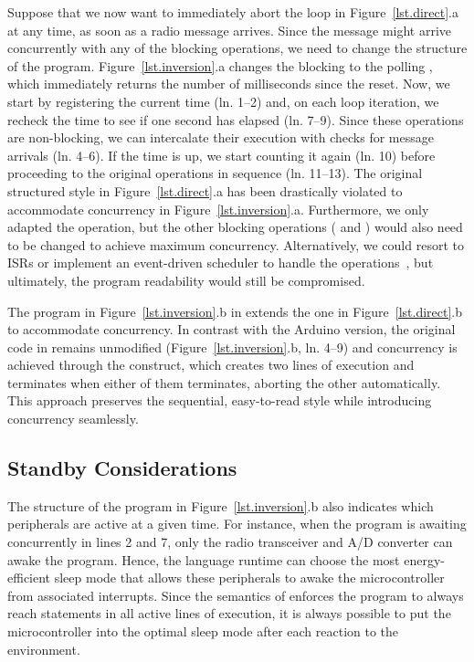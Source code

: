 Suppose that we now want to immediately abort the loop in
Figure~\ref{lst.direct}.a at any time, as soon as a radio message arrives.
%
Since the message might arrive concurrently with any of the blocking
operations, we need to change the structure of the program.
%
Figure~\ref{lst.inversion}.a changes the blocking  to the polling
, which immediately returns the number of milliseconds since the
reset.
Now, we start by registering the current time (ln. 1--2) and, on each loop
iteration, we recheck the time to see if one second has elapsed (ln. 7--9).
Since these operations are non-blocking, we can intercalate their execution
with checks for message arrivals (ln. 4--6).
If the time is up, we start counting it again (ln. 10) before proceeding to the
original operations in sequence (ln. 11--13).
%
The original structured style in Figure~\ref{lst.direct}.a has been drastically
violated to accommodate concurrency in Figure~\ref{lst.inversion}.a.
Furthermore, we only adapted the  operation, but the other blocking
operations ( and ) would also need to be
changed to achieve maximum concurrency.
%
Alternatively, we could resort to ISRs or implement an event-driven
scheduler to handle the operations~\cite{wsn.nesc}, but ultimately, the
program readability would still be compromised.

The program in Figure~\ref{lst.inversion}.b in \CEU extends the one in
Figure~\ref{lst.direct}.b to accommodate concurrency.
%
In contrast with the Arduino version, the original code in \CEU remains
unmodified (Figure~\ref{lst.inversion}.b, ln. 4--9) and concurrency is achieved
through the  construct, which creates two lines of execution and
terminates when either of them terminates, aborting the other automatically.
%
This approach preserves the sequential, easy-to-read style while introducing
concurrency seamlessly.

\subsection*{Standby Considerations}
\label{sec.ceu.standby}

The structure of the program in Figure~\ref{lst.inversion}.b also indicates
which peripherals are active at a given time.
%
For instance, when the program is awaiting concurrently in lines 2 and 7,
only the radio transceiver and A/D converter can awake the program.
Hence, the language runtime can choose the most energy-efficient sleep mode
that allows these peripherals to awake the microcontroller from associated
interrupts.
%
Since the semantics of \CEU enforces the program to always reach 
statements in all active lines of execution, it is always possible to put the
microcontroller into the optimal sleep mode after each reaction to the
environment.

